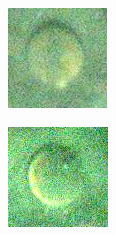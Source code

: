 \documentclass {udthesis}
\begin{document}
\begin{figure}
  \centering
  \begin{subfigure}[]{0.15\textwidth}
      \includegraphics[width=\textwidth]{dcrescent_scallop}
      \caption{}
      \label{subfig:dcrescent_scallop}
  \end{subfigure}
  \begin{subfigure}[]{0.15\textwidth}
      \includegraphics[width=\textwidth]{bcrescent_scallop}

\end{subfigure}
\end{figure}
\end{document}
